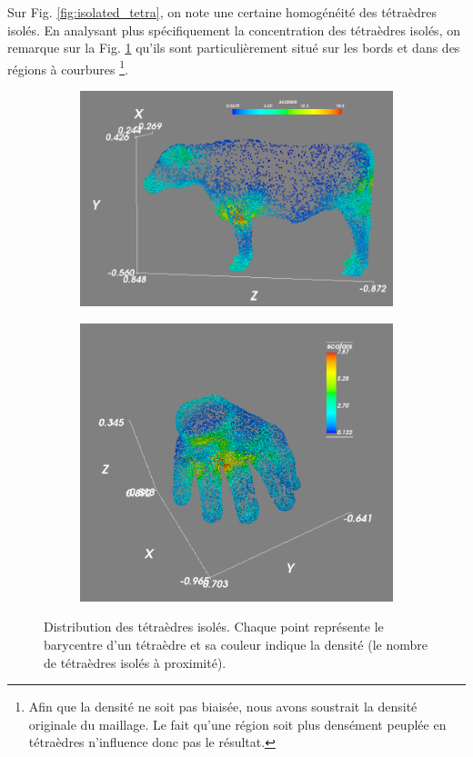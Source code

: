 \noindent
Sur Fig. \ref{fig:isolated_tetra}, on note une certaine homogénéité des tétraèdres isolés. En analysant plus spécifiquement la concentration des tétraèdres isolés, on remarque sur la Fig. \ref{fig:density_cow_hand} qu'ils sont particulièrement situé sur les bords et dans des régions à courbures \footnote{Afin que la densité ne soit pas biaisée, nous avons soustrait la densité originale du maillage. Le fait qu'une région soit plus densément peuplée en tétraèdres n'influence donc pas le résultat.}.
\begin{figure}[th]
\centering
\begin{subfigure}{.5\textwidth}
  \centering
  \includegraphics[scale=0.25]{Images/density_cow}
\end{subfigure}%
\begin{subfigure}{.5\textwidth}
  \centering
  \includegraphics[scale=0.22]{Images/hand_density}
\end{subfigure}
\caption{Distribution des tétraèdres isolés. Chaque point représente le barycentre d'un tétraèdre et sa couleur indique la densité (le nombre de tétraèdres isolés à proximité).}
\label{fig:density_cow_hand}
\end{figure}

